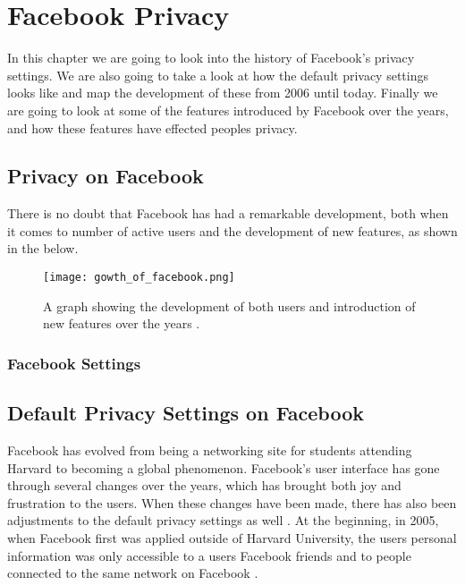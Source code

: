 \chapter{Facebook Privacy}
\label{chp:defaultprivacysettings} 


In this chapter we are going to look into the history of Facebook’s privacy settings. We are also going to take a look at how the default privacy settings looks like and map the development of these from 2006 until today. Finally we are going to look at some of the features introduced by Facebook over the years, and how these features have effected peoples privacy. 

\section{Privacy on Facebook}\label{sec:privacy_on_facebook}


There is no doubt that Facebook has had a remarkable development, both when it comes to number of active users and the development of new features, as shown in the  below. 

\begin{figure}[h!]
\centering
\texttt{[image: gowth\_of\_facebook.png]}
\caption{A graph showing the development of both users and introduction of new features over the years \cite{BBCFacebookGrowth}.} 
\label{fig:growth_of_facebook}
\end{figure}

\subsection{Facebook Settings}




\section{Default Privacy Settings on Facebook}\label{sec:default_privacy_settings}

Facebook has evolved from being a networking site for students attending Harvard to becoming a global phenomenon. Facebook's user interface has gone through several changes over the years, which has brought both joy and frustration to the users. When these changes have been made, there has also been adjustments to the default privacy settings as well \cite{EvoPriv2}. At the beginning, in 2005, when Facebook first was applied outside of Harvard University, the users personal information was only accessible to a users Facebook friends and to people connected to the same network on Facebook \cite{EvoPriv}. 


